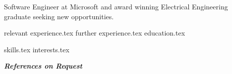 \documentclass[letterpaper,11pt]{article}
\begin{document}
\thispagestyle{empty}

\vspace{0.8cm} 

Software Engineer at Microsoft and award winning Electrical Engineering graduate seeking new opportunities.



{relevant experience.tex}
{further experience.tex}
{education.tex}


{skills.tex}
{interests.tex}
\thispagestyle{empty}

\centering
\textit{\textbf{References on Request}}
\end{document}
